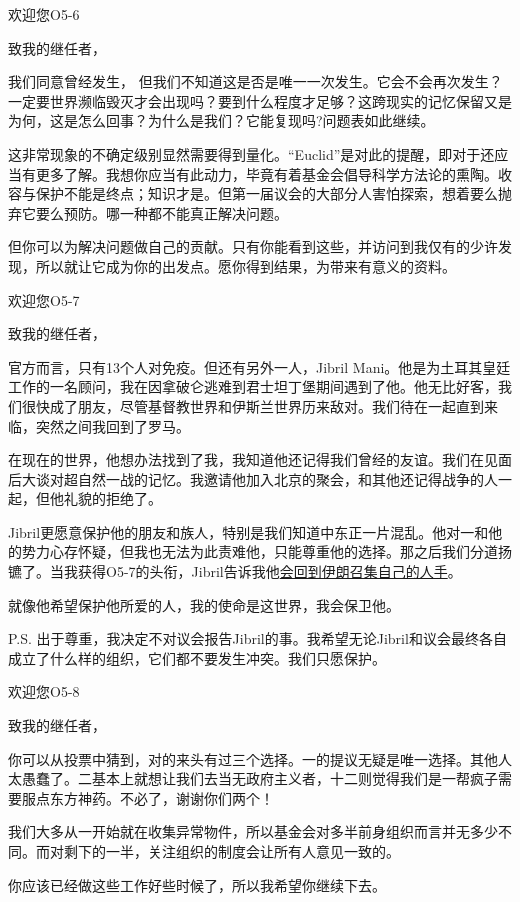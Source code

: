 \begin{scpbox}

欢迎您O5-6

致我的继任者，

我们同意曾经发生， 但我们不知道这是否是唯一一次发生。它会不会再次发生？一定要世界濒临毁灭才会出现吗？要到什么程度才足够？这跨现实的记忆保留又是为何，这是怎么回事？为什么是我们？它能复现吗?问题表如此继续。

这非常现象的不确定级别显然需要得到量化。“Euclid”是对此的提醒，即对于还应当有更多了解。我想你应当有此动力，毕竟有着基金会倡导科学方法论的熏陶。收容与保护不能是终点；知识才是。但第一届议会的大部分人害怕探索，想着要么抛弃它要么预防。哪一种都不能真正解决问题。

但你可以为解决问题做自己的贡献。只有你能看到这些，并访问到我仅有的少许发现，所以就让它成为你的出发点。愿你得到结果，为带来有意义的资料。

\end{scpbox}

\begin{scpbox}

欢迎您O5-7

致我的继任者，

官方而言，只有13个人对免疫。但还有另外一人，Jibril Mani。他是为土耳其皇廷工作的一名顾问，我在因拿破仑逃难到君士坦丁堡期间遇到了他。他无比好客，我们很快成了朋友，尽管基督教世界和伊斯兰世界历来敌对。我们待在一起直到来临，突然之间我回到了罗马。

在现在的世界，他想办法找到了我，我知道他还记得我们曾经的友谊。我们在见面后大谈对超自然一战的记忆。我邀请他加入北京的聚会，和其他还记得战争的人一起，但他礼貌的拒绝了。

Jibril更愿意保护他的朋友和族人，特别是我们知道中东正一片混乱。他对一和他的势力心存怀疑，但我也无法为此责难他，只能尊重他的选择。那之后我们分道扬镳了。当我获得O5-7的头衔，Jibril告诉我他\hyperref[chap:ORI-oria.hub]{会回到伊朗召集自己的人手}。

就像他希望保护他所爱的人，我的使命是这世界，我会保卫他。

P.S. 出于尊重，我决定不对议会报告Jibril的事。我希望无论Jibril和议会最终各自成立了什么样的组织，它们都不要发生冲突。我们只愿保护。

\end{scpbox}

\begin{scpbox}

欢迎您O5-8

致我的继任者，

你可以从投票中猜到，对的来头有过三个选择。一的提议无疑是唯一选择。其他人太愚蠢了。二基本上就想让我们去当无政府主义者，十二则觉得我们是一帮疯子需要服点东方神药。不必了，谢谢你们两个！

我们大多从一开始就在收集异常物件，所以基金会对多半前身组织而言并无多少不同。而对剩下的一半，关注组织的制度会让所有人意见一致的。

你应该已经做这些工作好些时候了，所以我希望你继续下去。

\end{scpbox}

